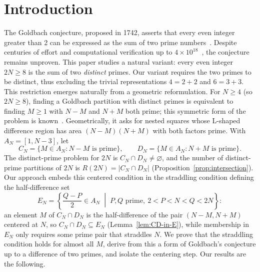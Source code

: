 \documentclass[11pt]{amsart}
\theoremstyle{definition}
\theoremstyle{remark}
\begin{document}
\section{Introduction}\label{sec:intro}
The Goldbach conjecture, proposed in 1742, asserts that every even integer greater than 2 can be expressed as the sum of two prime numbers~\cite{goldbach1843lettre}. Despite centuries of effort and computational verification up to $4 \times 10^{18}$~\cite{oliveira2014empirical}, the conjecture remains unproven. This paper studies a natural variant: every even integer $2N \geq 8$ is the sum of two \emph{distinct} primes.
Our variant requires the two primes to be distinct, thus excluding the trivial representations $4 = 2 + 2$ and $6 = 3 + 3$. This restriction emerges naturally from a geometric reformulation. For $N \geq 4$ (so $2N \geq 8$), finding a Goldbach partition with distinct primes is equivalent to finding $M\geq 1$ with $N-M$ and $N+M$ both prime; this symmetric form of the problem is known~\cite{oeisA082467}. Geometrically, it asks for nested squares whose L-shaped difference region has area $(N-M)(N+M)$ with both factors prime.
With $A_N=[1,N-3]$, let
\[
C_N=\{M\in A_N: N-M \text{ is prime}\},\qquad D_N=\{M\in A_N: N+M \text{ is prime}\}.
\]
The distinct-prime problem for $2N$ is $C_N\cap D_N\neq\varnothing$, and the number of distinct-prime partitions of $2N$ is $R(2N)=|C_N\cap D_N|$ (Proposition~\ref{prop:intersection}). Our approach embeds this centered condition in the straddling condition defining the half-difference set
\[
E_N=\left\{\frac{Q-P}{2}\in A_N\;\middle|\; P,Q \text{ prime},\ 2<P<N<Q<2N\right\}:
\]
an element $M$ of $C_N\cap D_N$ is the half-difference of the pair $(N-M,N+M)$ centered at $N$, so $C_N\cap D_N\subseteq E_N$ (Lemma~\ref{lem:CD-in-E}), while membership in $E_N$ only requires some prime pair that straddles $N$. We prove that the straddling condition holds for almost all $M$, derive from this a form of Goldbach's conjecture up to a difference of two primes, and isolate the centering step. Our results are the following.
\end{document}
